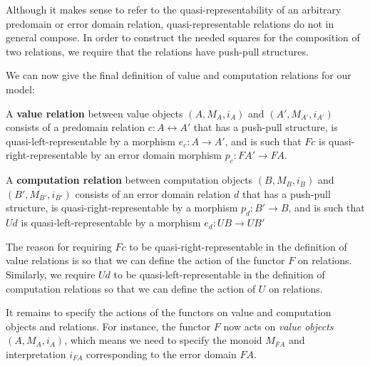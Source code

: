 Although it makes sense to refer to the quasi-representability of an arbitrary
predomain or error domain relation, quasi-representable relations do not in
general compose. In order to construct the needed squares for the composition of
two relations, we require that the relations have push-pull structures.

We can now give the final definition of value and computation relations for our
model:
%
\begin{definition}
A \textbf{value relation} between value objects $(A, M_A, i_A)$ and $(A',
M_{A'}, i_{A'})$ consists of a predomain relation $c : A \rel A'$ that has a
push-pull structure, is quasi-left-representable by a morphism $e_c : A \to A'$,
and is such that $Fc$ is quasi-right-representable by an error domain morphism
$p_c : FA' \to FA$.
\end{definition}

\begin{definition}
A \textbf{computation relation} between computation objects $(B, M_B, i_B)$ and
$(B', M_{B'}, i_{B'})$ consists of an error domain relation $d$ that has a
push-pull structure, is quasi-right-representable by a morphism $p_d : B' \to
B$, and is such that $Ud$ is quasi-left-representable by a morphism $e_d : UB
\to UB'$
\end{definition}

The reason for requiring $Fc$ to be quasi-right-representable in the definition
of value relations is so that we can define the action of the functor $F$ on
relations. Similarly, we require $Ud$ to be quasi-left-representable in the
definition of computation relations so that we can define the action of $U$ on
relations.

It remains to specify the actions of the functors on value and computation
objects and relations.
For instance, the functor $F$ now acts on
\emph{value objects} $(A, M_A, i_A)$, which means we need to specify the monoid
$M_{FA}$ and interpretation $i_{FA}$ corresponding to the error domain $FA$.

